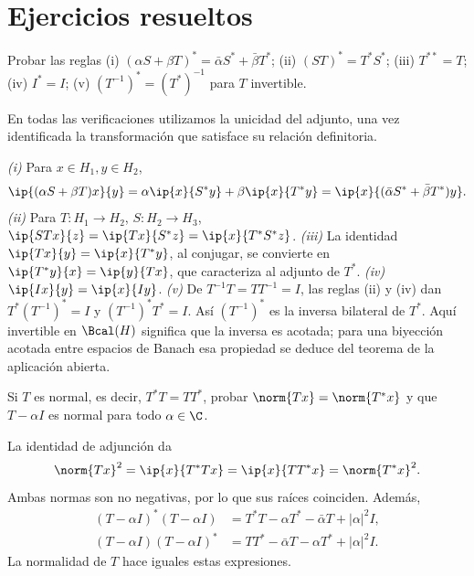 \section{Ejercicios resueltos}

\begin{ejercicio}
Probar las reglas (i) $(\alpha S+\beta T)^*=\bar\alpha S^*+\bar\beta T^*$; (ii) $(ST)^*=T^*S^*$; (iii) $T^{**}=T$; (iv) $I^*=I$; (v) $(T^{-1})^*=(T^*)^{-1}$ para $T$ invertible.
\end{ejercicio}
\begin{solucion}
En todas las verificaciones utilizamos la unicidad del adjunto, una vez identificada la transformación que satisface su relación definitoria.

\emph{(i)} Para $x\in H_1,y\in H_2$,
\[
 \ip{(\alpha S+\beta T)x}{y}
 =\alpha\ip{x}{S^*y}+\beta\ip{x}{T^*y}
 =\ip{x}{(\bar\alpha S^*+\bar\beta T^*)y}.
\]
\emph{(ii)} Para $T:H_1\to H_2$, $S:H_2\to H_3$,
$\ip{STx}{z}=\ip{Tx}{S^*z}=\ip{x}{T^*S^*z}$.
\emph{(iii)} La identidad $\ip{Tx}{y}=\ip{x}{T^*y}$, al conjugar, se convierte en $\ip{T^*y}{x}=\ip{y}{Tx}$, que caracteriza al adjunto de $T^*$.
\emph{(iv)} $\ip{Ix}{y}=\ip{x}{Iy}$.
\emph{(v)} De $T^{-1}T=TT^{-1}=I$, las reglas (ii) y (iv) dan
$T^*(T^{-1})^*=I$ y $(T^{-1})^*T^*=I$. Así $(T^{-1})^*$ es la inversa bilateral de $T^*$. Aquí invertible en $\Bcal(H)$ significa que la inversa es acotada; para una biyección acotada entre espacios de Banach esa propiedad se deduce del teorema de la aplicación abierta.
\end{solucion}

\begin{ejercicio}
Si $T$ es normal, es decir, $T^*T=TT^*$, probar $\norm{Tx}=\norm{T^*x}$ y que $T-\alpha I$ es normal para todo $\alpha\in\C$.
\end{ejercicio}
\begin{solucion}
La identidad de adjunción da
\[
 \norm{Tx}^{2}=\ip{x}{T^*Tx}=\ip{x}{TT^*x}=\norm{T^*x}^{2}.
\]
Ambas normas son no negativas, por lo que sus raíces coinciden. Además,
\begin{align*}
 (T-\alpha I)^*(T-\alpha I)
 &=T^*T-\alpha T^*-\bar\alpha T+|\alpha|^2I,\\
 (T-\alpha I)(T-\alpha I)^*
 &=TT^*-\bar\alpha T-\alpha T^*+|\alpha|^2I.
\end{align*}
La normalidad de $T$ hace iguales estas expresiones.
\end{solucion}

